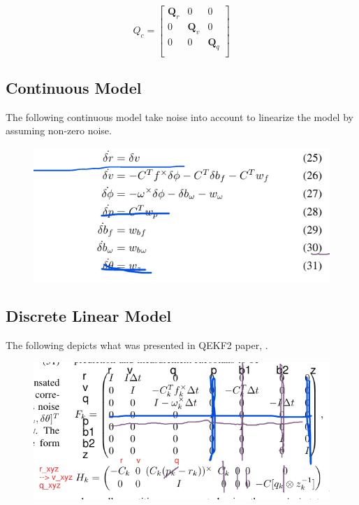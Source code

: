 \documentclass[letterpaper, 10 pt, conference]{ieeeconf}  %
\begin{document}
\begin{equation}
Q_{c} =
  \begin{bmatrix}
    \mathbf{Q}_{r} & 0 & 0 \\
    0 & \mathbf{Q}_{v} & 0 \\
    0 & 0 & \mathbf{Q}_{q} \\
  \end{bmatrix}
\end{equation}



\subsection{Continuous Model}
The following continuous model take noise into account to linearize the model
by assuming non-zero noise.

\begin{figure}[h]
        \includegraphics[width=.45\textwidth]{fig03_contModel.png}
        \centering
\end{figure}

\subsection{Discrete Linear Model}
The following depicts what was presented in QEKF2 paper, \cite{rotella2014state}.

\begin{figure}[h]
        \includegraphics[width=.45\textwidth]{fig02_ldm.png}
        \centering
\end{figure}
\end{document}
